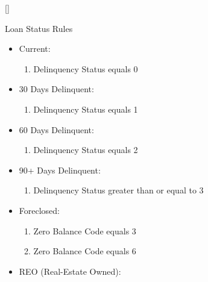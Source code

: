 \begin{appendices}
\begin{table}[h]
    \end{table}
    \footnotesize{[]}

    
    

 
    \begin{table}[h]
        \centering
        \caption{Loan Status Rules}
        \label{appendix: loan_state_rules}
        \begin{itemize}
            \item Current:
                \begin{enumerate}
                    \item Delinquency Status equals 0
                \end{enumerate}
            \item 30 Days Delinquent:
                \begin{enumerate}
                    \item Delinquency Status equals 1
                \end{enumerate}
            \item 60 Days Delinquent:
                \begin{enumerate}
                    \item Delinquency Status equals 2
                \end{enumerate}
            \item 90+ Days Delinquent:
                \begin{enumerate}
                    \item Delinquency Status greater than or equal to 3
                \end{enumerate}
            \item Foreclosed:
                \begin{enumerate}
                    \item Zero Balance Code equals 3
                    \item Zero Balance Code equals 6
                \end{enumerate}
            \item REO (Real-Estate Owned):

\end{itemize}
\end{table}
\end{appendices}
